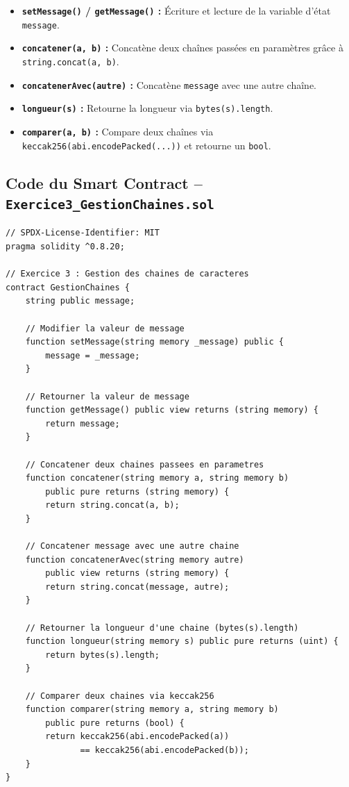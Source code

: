 \documentclass[12pt,a4paper]{report}
\begin{document}
\begin{itemize}
    \item \textbf{\texttt{setMessage()} / \texttt{getMessage()} :} Écriture et lecture de la
          variable d'état \texttt{message}.
    \item \textbf{\texttt{concatener(a, b)} :} Concatène deux chaînes passées en paramètres
          grâce à \texttt{string.concat(a, b)}.
    \item \textbf{\texttt{concatenerAvec(autre)} :} Concatène \texttt{message} avec une autre chaîne.
    \item \textbf{\texttt{longueur(s)} :} Retourne la longueur via \texttt{bytes(s).length}.
    \item \textbf{\texttt{comparer(a, b)} :} Compare deux chaînes via \texttt{keccak256(abi.encodePacked(...))}
          et retourne un \texttt{bool}.
\end{itemize}

\subsection{Code du Smart Contract -- \texttt{Exercice3\_GestionChaines.sol}}
\begin{lstlisting}[language=Solidity, caption={Contrat GestionChaines.sol -- manipulation de string}]
// SPDX-License-Identifier: MIT
pragma solidity ^0.8.20;

// Exercice 3 : Gestion des chaines de caracteres
contract GestionChaines {
    string public message;

    // Modifier la valeur de message
    function setMessage(string memory _message) public {
        message = _message;
    }

    // Retourner la valeur de message
    function getMessage() public view returns (string memory) {
        return message;
    }

    // Concatener deux chaines passees en parametres
    function concatener(string memory a, string memory b)
        public pure returns (string memory) {
        return string.concat(a, b);
    }

    // Concatener message avec une autre chaine
    function concatenerAvec(string memory autre)
        public view returns (string memory) {
        return string.concat(message, autre);
    }

    // Retourner la longueur d'une chaine (bytes(s).length)
    function longueur(string memory s) public pure returns (uint) {
        return bytes(s).length;
    }

    // Comparer deux chaines via keccak256
    function comparer(string memory a, string memory b)
        public pure returns (bool) {
        return keccak256(abi.encodePacked(a))
               == keccak256(abi.encodePacked(b));
    }
}
\end{lstlisting}
\end{document}
